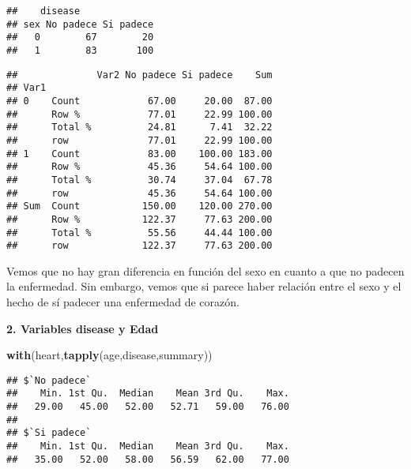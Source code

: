 \documentclass[]{article}
\newenvironment{Shaded}{\begin{snugshade}}{\end{snugshade}}
\newcommand{\KeywordTok}[1]{\textcolor[rgb]{0.13,0.29,0.53}{\textbf{#1}}}
\newcommand{\DataTypeTok}[1]{\textcolor[rgb]{0.13,0.29,0.53}{#1}}
\newcommand{\StringTok}[1]{\textcolor[rgb]{0.31,0.60,0.02}{#1}}
\newcommand{\OperatorTok}[1]{\textcolor[rgb]{0.81,0.36,0.00}{\textbf{#1}}}
\newcommand{\NormalTok}[1]{#1}
\begin{document}
\begin{verbatim}
##    disease
## sex No padece Si padece
##   0        67        20
##   1        83       100
\end{verbatim}

\begin{Shaded}
\end{Shaded}

\begin{verbatim}
##              Var2 No padece Si padece    Sum
## Var1                                        
## 0    Count            67.00     20.00  87.00
##      Row %            77.01     22.99 100.00
##      Total %          24.81      7.41  32.22
##      row              77.01     22.99 100.00
## 1    Count            83.00    100.00 183.00
##      Row %            45.36     54.64 100.00
##      Total %          30.74     37.04  67.78
##      row              45.36     54.64 100.00
## Sum  Count           150.00    120.00 270.00
##      Row %           122.37     77.63 200.00
##      Total %          55.56     44.44 100.00
##      row             122.37     77.63 200.00
\end{verbatim}

Vemos que no hay gran diferencia en función del sexo en cuanto a que no
padecen la enfermedad. Sin embargo, vemos que si parece haber relación
entre el sexo y el hecho de sí padecer una enfermedad de corazón.

\textbf{2. Variables disease y Edad}

\begin{Shaded}
\begin{Highlighting}[]
\KeywordTok{with}\NormalTok{(heart,}\KeywordTok{tapply}\NormalTok{(age,disease,summary)) }
\end{Highlighting}
\end{Shaded}

\begin{verbatim}
## $`No padece`
##    Min. 1st Qu.  Median    Mean 3rd Qu.    Max. 
##   29.00   45.00   52.00   52.71   59.00   76.00 
## 
## $`Si padece`
##    Min. 1st Qu.  Median    Mean 3rd Qu.    Max. 
##   35.00   52.00   58.00   56.59   62.00   77.00
\end{verbatim}
\end{document}
